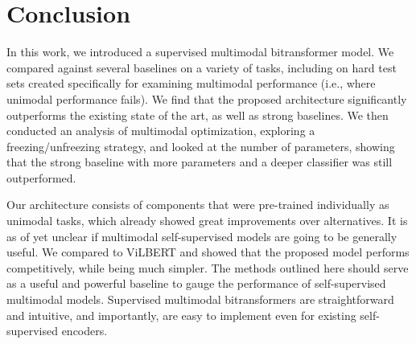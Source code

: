 \documentclass[11pt,a4paper]{article}
\begin{document}
\section{Conclusion}

In this work, we introduced a supervised multimodal bitransformer model. We compared against several baselines on a variety of tasks, including on hard test sets created specifically for examining multimodal performance (i.e., where unimodal performance fails). We find that the proposed architecture significantly outperforms the existing state of the art, as well as strong baselines. We then conducted an analysis of multimodal optimization, exploring a freezing/unfreezing strategy, and looked at the number of parameters, showing that the strong baseline with more parameters and a deeper classifier was still outperformed.

Our architecture consists of components that were pre-trained individually as unimodal tasks, which already showed great improvements over alternatives. It is as of yet unclear if multimodal self-supervised models are going to be generally useful. We compared to ViLBERT and showed that the proposed model performs competitively, while being much simpler. The methods outlined here should serve as a useful and powerful baseline to gauge the performance of self-supervised multimodal models. Supervised multimodal bitransformers are straightforward and intuitive, and importantly, are easy to implement even for existing self-supervised encoders.



\end{document}
